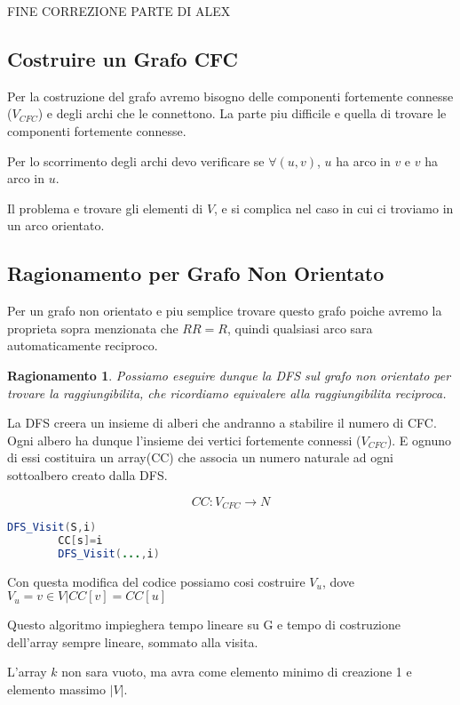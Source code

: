 FINE CORREZIONE PARTE DI ALEX 
\subsection{Costruire un Grafo CFC}
Per la costruzione del grafo avremo bisogno delle componenti fortemente connesse ($V_{CFC}$) e degli archi che le connettono. La parte piu difficile e quella di trovare le componenti fortemente connesse.

Per lo scorrimento degli archi devo verificare se $\forall(u,v)$, $u$ ha arco in $v$ e $v$ ha arco in $u$.

Il problema e trovare gli elementi di $V$, e si complica nel caso in cui ci troviamo in un arco orientato.

\subsection{Ragionamento per Grafo Non Orientato}
Per un grafo non orientato e piu semplice trovare questo grafo poiche avremo la proprieta sopra menzionata che $RR = R$, quindi qualsiasi arco sara automaticamente reciproco.

\newtheorem{ragnonorientato}{Ragionamento}

\begin{ragnonorientato}
	Possiamo eseguire dunque la DFS sul grafo non orientato per trovare la raggiungibilita, che ricordiamo equivalere alla raggiungibilita reciproca.
\end{ragnonorientato}

La DFS creera un insieme di alberi che andranno a stabilire il numero di CFC.
Ogni albero ha dunque l'insieme dei vertici fortemente connessi ($V_{CFC}$). E ognuno di essi costituira un array(CC) che associa un numero naturale ad ogni sottoalbero creato dalla DFS.

$$CC : V_{CFC} \rightarrow N$$


\begin{lstlisting}[language=Java]
	DFS_Visit(S,i)
		CC[s]=i
		DFS_Visit(...,i)
\end{lstlisting}

Con questa modifica del codice possiamo cosi costruire $V_{u}$, dove $V_u = {v \in V | CC[v] = CC[u]}$


Questo algoritmo impieghera tempo lineare su G e tempo di costruzione dell'array sempre lineare, sommato alla visita.

L'array $k$ non sara vuoto, ma avra come elemento minimo di creazione 1 e elemento massimo $|V|$.

